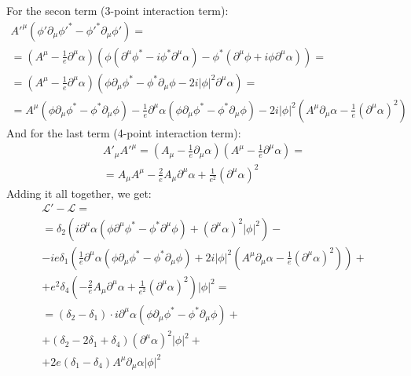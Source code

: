 \documentclass{article}
\begin{document}
For the secon term (3-point interaction term):
\begin{equation}
\begin{gathered}
    A'^\mu \left(\phi' \partial_\mu \phi'^* - \phi'^* \partial_\mu \phi' \right) = \\ =
    \left(A^\mu - \frac{1}{e}\partial^\mu\alpha\right)\left(\phi\left(\partial^\mu\phi^* - i\phi^*\partial^\mu\alpha\right) - \phi^*\left(\partial^\mu\phi + i\phi\partial^\mu\alpha\right)\right) = \\ =
    \left(A^\mu - \frac{1}{e}\partial^\mu\alpha\right)\left(\phi\partial_\mu \phi^* - \phi^* \partial_\mu \phi - 2i|\phi|^2\partial^\mu\alpha\right) = \\ =
    A^\mu \left(\phi\partial_\mu \phi^* - \phi^* \partial_\mu \phi\right) - \frac{1}{e}\partial^\mu\alpha\left(\phi\partial_\mu \phi^* - \phi^* \partial_\mu \phi\right) - 2i|\phi|^2\left(A^\mu\partial_\mu\alpha - \frac{1}{e}\left(\partial^\mu\alpha\right)^2\right)
\end{gathered}
\end{equation}
And for the last term (4-point interaction term):
\begin{equation}
\begin{gathered}
    A'_\mu A'^\mu = \left(A_\mu - \frac{1}{e}\partial_\mu\alpha\right)\left(A^\mu - \frac{1}{e}\partial^\mu\alpha\right) = \\ =
    A_\mu A^\mu - \frac{2}{e}A_\mu\partial^\mu \alpha + \frac{1}{e^2}(\partial^\mu \alpha)^2
\end{gathered}
\end{equation}
Adding it all together, we get:
\begin{equation}
\begin{gathered}
    \mathcal{L}' - \mathcal{L} = \\ =
    \delta_2\left(i \partial^\mu \alpha (\phi \partial^\mu\phi^* - \phi^*\partial^\mu\phi) + \left(\partial^\mu \alpha\right)^2 |\phi|^2\right) - \\ -
    ie\delta_1\left(
        \frac{1}{e}\partial^\mu\alpha\left(\phi\partial_\mu \phi^* - \phi^* \partial_\mu \phi\right) +
        2i|\phi|^2\left(A^\mu\partial_\mu\alpha - \frac{1}{e}\left(\partial^\mu\alpha\right)^2\right)
    \right) + \\ +
    e^2 \delta_{4} \left(-\frac{2}{e}A_\mu\partial^\mu \alpha + \frac{1}{e^2}(\partial^\mu \alpha)^2\right) |\phi|^2 = \\ =
    \left(\delta_2 - \delta_1\right)\cdot i \partial^\mu\alpha\left(\phi\partial_\mu \phi^* - \phi^* \partial_\mu \phi\right) + \\ +
    \left(\delta_2 - 2\delta_1 + \delta_4\right)(\partial^\mu \alpha)^2 |\phi|^2 + \\ +
    2e \left(\delta_1 - \delta_4\right)A^\mu \partial_\mu \alpha |\phi|^2
\end{gathered}
\end{equation}
\end{document}
